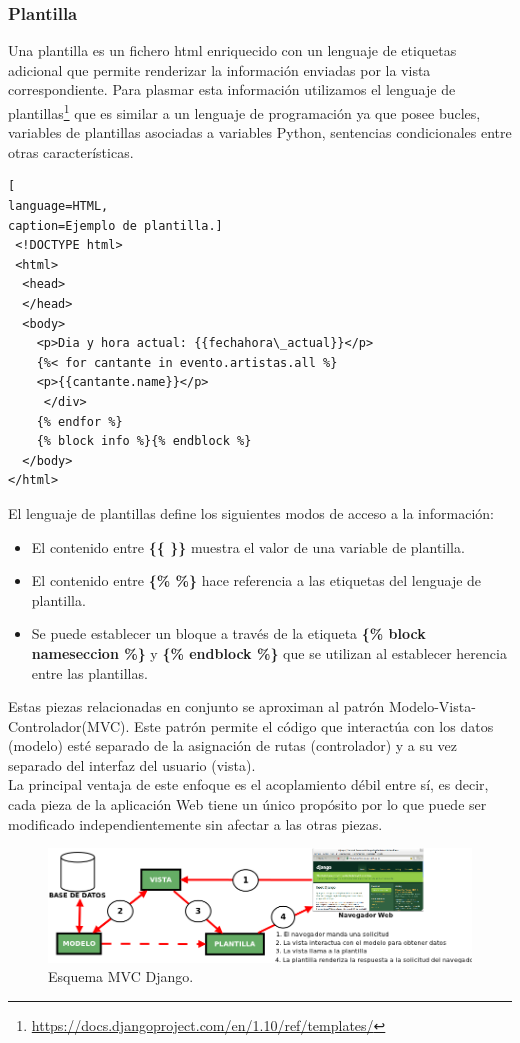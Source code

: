 \subsubsection*{Plantilla}
Una plantilla es un fichero html enriquecido con un lenguaje de etiquetas adicional que permite renderizar la información enviadas por la vista correspondiente. Para plasmar esta información utilizamos el lenguaje de plantillas\footnote{\url{https://docs.djangoproject.com/en/1.10/ref/templates/}} que es similar a un lenguaje de programación ya que posee bucles, variables de plantillas asociadas a variables Python, sentencias condicionales entre otras características.
\begin{lstlisting}[
language=HTML,
caption=Ejemplo de plantilla.]
 <!DOCTYPE html>
 <html>
  <head>
  </head>
  <body>
    <p>Dia y hora actual: {{fechahora\_actual}}</p>
    {%< for cantante in evento.artistas.all %}
    <p>{{cantante.name}}</p>
     </div>
    {% endfor %}
    {% block info %}{% endblock %}
  </body>    
</html>
\end{lstlisting}
 El lenguaje de plantillas define los siguientes modos de acceso a la información:
\begin{itemize}
\item El contenido entre \textbf{\{\{ \}\}} muestra el valor de una variable de plantilla.
\item El contenido entre \textbf{\{\% \%\}} hace referencia a las etiquetas del lenguaje de plantilla.
\item Se puede establecer un bloque a través de la etiqueta \textbf{\{\% block nameseccion \%\}} y \textbf{\{\% endblock \%\}} que se utilizan al establecer herencia entre las plantillas.
\end{itemize}
Estas piezas relacionadas en conjunto se aproximan al patrón Modelo-Vista-Controlador(MVC). Este patrón permite el código que interactúa con los datos (modelo) esté separado de la asignación de rutas (controlador) y a su vez separado del interfaz del usuario (vista).
\\La principal ventaja de este enfoque es el acoplamiento débil entre sí, es decir, cada pieza de la aplicación Web tiene un único propósito por lo que puede ser modificado independientemente sin afectar a las otras piezas.
\begin{figure}[!h]
\begin{center}
   \includegraphics[width=0.85\linewidth]{Figures/esquemaDjango}
  \decoRule
  \caption[Esquema MVC Django.]{Esquema MVC Django.}
\label{fig:esquemaDjango}
\end{center}
\end{figure}

